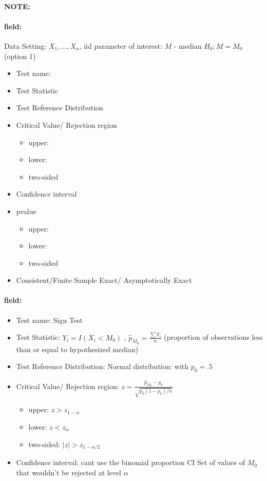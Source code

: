 \documentclass[12pt]{article}
\newenvironment{note}{\paragraph{NOTE:}}{}
\newenvironment{field}{\paragraph{field:}}{}
\begin{document}
\begin{note}
  \begin{field}
    Data Setting: $X_1, \ldots, X_n$, iid parameter of interest: $M$ - median $H_0: M = M_0$ (option 1)
    \begin{itemize}
			\item Test name:
			\item Test Statistic
			\item Test Reference Distribution
			\item Critical Value/ Rejection region
			      \begin{itemize}
				      \item upper:
				      \item lower:
				      \item two-sided
			      \end{itemize}
			\item Confidence interval
			\item pvalue
			      \begin{itemize}
				      \item upper:
				      \item lower:
				      \item two-sided
			      \end{itemize}
			\item Consistent/Finite Sample Exact/ Asymptotically Exact
		\end{itemize}
  \end{field}
  \begin{field}
    \begin{itemize}
			\item Test name: Sign Test
			\item Test Statistic: $Y_i = I(X_i < M_0)$ , $\hat{p}_{M_0} = \frac{\sum Y_i}{n}$ (proportion of observations less than or equal to hypothesized median)
			\item Test Reference Distribution: Normal distribution: with $p_0 = .5$
			\item Critical Value/ Rejection region: $z = \frac{\hat{p}_{M_0} - p_0}{\sqrt{p_0(1-p_0)/n}}$
      \begin{itemize}
        \item upper: $z > z_{1-\alpha}$
        \item lower: $z < z_\alpha$
        \item two-sided: $|z| > z_{1-\alpha/2}$
      \end{itemize}
			\item Confidence interval: cant use the binomial proportion CI
        Set of values of $M_0$ that wouldn't be rejected at level $\alpha$


\end{itemize}
\end{field}
\end{note}
\end{document}
